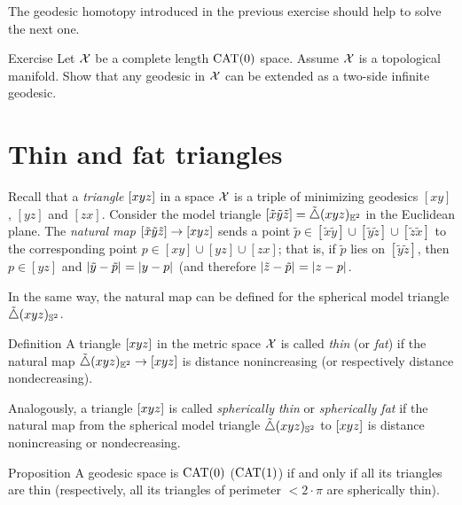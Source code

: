The geodesic homotopy introduced in the previous exercise should help to solve the next one.

\begin{thm}{Exercise}\label{ex:CAT-mnfld=>ext.geod}
Let $\mathcal{X}$ be a complete length $\mathrm{CAT}(0)$ space.
Assume $\mathcal{X}$ is a topological manifold.
Show that any geodesic in $\mathcal{X}$ can be extended 
as a two-side infinite geodesic.
\end{thm}
 

\section{Thin and fat triangles}

Recall that a \emph{triangle} $[xyz]$ in a space $\mathcal{X}$ 
is a triple of minimizing geodesics $[xy]$, $[yz]$ and $[zx]$.
Consider the  model triangle $[\tilde x\tilde y\tilde z]=\tilde\triangle{}({x}{y}{z})_{\mathbb{E}^2}$ in the Euclidean plane.
The \emph{natural map} $[\tilde x\tilde y\tilde z]\to [xyz]$ 
sends a point $\tilde p\in[\tilde x\tilde y]\cup[\tilde y\tilde z]\cup[\tilde z\tilde x]$ to the corresponding point $p\in[ x y]\cup[y z]\cup[ z x]$;
that is, if $\tilde p$ lies on $[\tilde y\tilde z]$,
then $p\in [y z]$ and $\dist{\tilde y}{\tilde p}{}=\dist{y}{p}{}$ (and therefore $\dist{\tilde z}{\tilde p}{}=\dist{z}{p}{}$.

In the same way, the natural map can be defined for the spherical model triangle $\tilde\triangle{}({x}{y}{z})_{\mathbb{S}^2}$.
 
\begin{thm}{Definition}\label{def:k-thin}
A triangle $[xyz]$ in the metric space $\mathcal{X}$ 
is called \emph{thin} (or \emph{fat}) if the natural map $\tilde\triangle{}({x}{y}{z})_{\mathbb{E}^2}\to [xyz]$ is distance nonincreasing (or respectively distance nondecreasing).

Analogously, a triangle $[xyz]$ 
is called \emph{spherically thin} or \emph{spherically fat} if
the natural map from the spherical model triangle $\tilde\triangle{}({x}{y}{z})_{\mathbb{S}^2}$ to $[xyz]$ is distance nonincreasing or nondecreasing.
\end{thm}

\begin{thm}{Proposition}\label{prop:thin=cat}
A geodesic space is $\mathrm{CAT}(0)$ 
($\mathrm{CAT}(1)$) 
if and only if 
all its triangles are thin (respectively, all its triangles of perimeter $<2\cdot\pi$ are spherically thin).
\end{thm}

